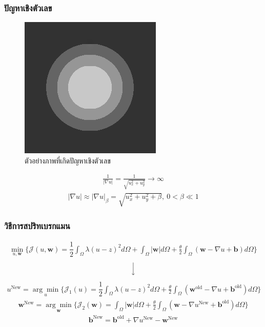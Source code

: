 \documentclass[xcolor=dvipsnames, xetex,serif]{beamer}
\numberwithin{equation}{section}
\begin{document}
	\begin{frame}
		\frametitle{ปัญหาเชิงตัวเลข}
			\begin{figure}[H]
			\centering
			\includegraphics[width=0.2\linewidth]{images/grad_problem.png}
			\caption{ตัวอย่างภาพที่เกิดปัญหาเชิงตัวเลข}
			\label{image:rgb-space}
			\end{figure}
			\begin{align*}
			\tfrac{1}{| \nabla u |}=\tfrac{1}{\sqrt{u_x^2+u_y^2}} \rightarrow \infty
			\end{align*}
			\begin{align*}
			|\nabla u| \approx| \nabla u |_\beta=\sqrt{u_x^2+u_y^2+\beta},\ 0< \beta \ll 1
			\end{align*}
	\end{frame}
	\begin{frame}
		\frametitle{วิธีการสปริทเบรกแมน}
			\begin{align*}
		\min_{u,\boldsymbol{w}} \{ \mathcal{J}(u,\boldsymbol{w}) = \dfrac{1}{2} \int_{\Omega} \lambda(u-z)^2 d\Omega +  \int_{\Omega}  |\boldsymbol{w}|  d\Omega + \frac{\theta}{2} \int_{\Omega} (\boldsymbol{w} - \nabla u + \boldsymbol{b}) d\Omega \}
		\end{align*}
		$$ \Big \downarrow$$
		\begin{align*}
		u^{\text{New}}=\underset{u}{\arg\min} \{ \mathcal{J}_1(u) = \dfrac{1}{2} \int_{\Omega} \lambda(u-z)^2 d\Omega + \frac{\theta}{2} \int_{\Omega} (\boldsymbol{w}^{\text{old}} - \nabla u + \boldsymbol{b}^{\text{old}}) d\Omega \}
		\end{align*}
		\begin{align*}
		\boldsymbol{w}^{\text{New}}=\underset{\boldsymbol{w}}{\arg\min} \{ \mathcal{J}_2(\boldsymbol{w}) = \int_{\Omega}  | \boldsymbol{w}|  d\Omega  + \frac{\theta}{2} \int_{\Omega} (\boldsymbol{w} - \nabla u^{\text{New}} + \boldsymbol{b}^{\text{old}}) d\Omega \}
		\end{align*}
		\begin{align*}
		\boldsymbol{b}^{\text{New}}=\boldsymbol{b}^{\text{old}}+\nabla u^{\text{New}}-\boldsymbol{w}^{\text{New}}
		\end{align*}
	\end{frame}  
\end{document}
